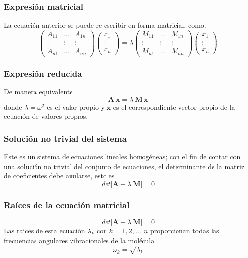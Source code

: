 \begin{frame}
\frametitle{Expresión matricial}
La ecuación anterior se puede re-escribir en forma matricial, como.
\[ \begin{pmatrix}
A_{11} & \ldots & A_{1n} \\
\vdots & \vdots & \vdots \\
A_{n1} & \ldots & A_{nn}
\end{pmatrix}
\begin{pmatrix}
x_{1} \\
\vdots \\
x_{n}
\end{pmatrix} = \lambda
\begin{pmatrix}
M_{11} & \ldots & M_{1n} \\
\vdots & \vdots & \vdots \\
M_{n1} & \ldots & M_{nn}
\end{pmatrix}
\begin{pmatrix}
x_{1} \\
\vdots \\
x_{n}
\end{pmatrix}
\]
\end{frame}
\begin{frame}
\frametitle{Expresión reducida}
De manera equivalente
\[ \mathbf{A \: x} = \lambda \: \mathbf{M \: x} \]
donde $\lambda= \omega^{2}$ es el valor propio y $\mathbf{x}$ es el correspondiente vector propio de la ecuación de valores propios.\\
\end{frame}
\begin{frame}
\frametitle{Solución no trivial del sistema}
Este es un sistema de ecuaciones lineales homogéneas; con el fin de contar con una solución no trivial del conjunto de ecuaciones, el determinante de la matriz de coeficientes debe anularse, esto es
\[ det \vert \mathbf{A} - \lambda \: \mathbf{M} \vert = 0  \]
\end{frame}
\begin{frame}
\frametitle{Raíces de la ecuación matricial}
\[ det \vert \mathbf{A} - \lambda \: \mathbf{M} \vert = 0  \]
Las raíces de esta ecuación $\lambda_{k}$ con $k = 1, 2, \ldots, n$ proporcionan todas las frecuencias angulares vibracionales de la molécula
\[ \omega_{k} = \sqrt{\lambda_{k}}\]
\end{frame}
